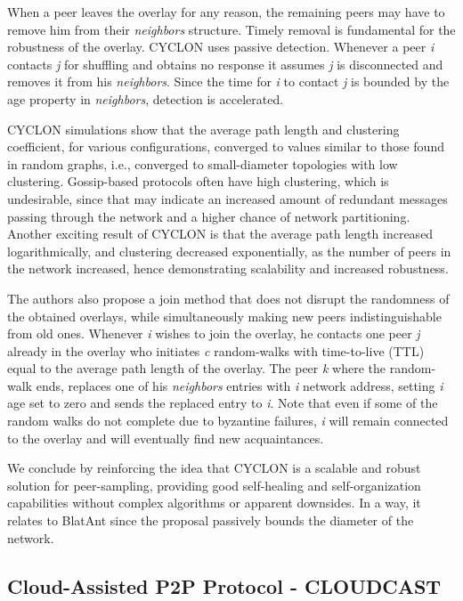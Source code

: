 \documentclass[runningheads]{llncs}
\begin{document}
When a peer leaves the overlay for any reason, the remaining peers may have to remove him from their \textit{neighbors} structure. Timely removal is fundamental for the robustness of the overlay.  CYCLON uses passive detection. Whenever a peer \textit{i} contacts \textit{j} for shuffling and obtains no response it assumes \textit{j} is disconnected and removes it from his \textit{neighbors}. Since the time for \textit{i} to contact \textit{j} is bounded by the age property in \textit{neighbors}, detection is accelerated.

CYCLON simulations show that the average path length and clustering coefficient, for various configurations, converged to values similar to those found in random graphs, i.e., converged to small-diameter topologies with low clustering. Gossip-based protocols often have high clustering, which is undesirable, since that may indicate an increased amount of redundant messages passing through the network and a higher chance of network partitioning. Another exciting result of CYCLON is that the average path length increased logarithmically, and clustering decreased exponentially, as the number of peers in the network increased, hence demonstrating scalability and increased robustness.

The authors also propose a join method that does not disrupt the randomness of the obtained overlays, while simultaneously making new peers indistinguishable from old ones. Whenever \textit{i} wishes to join the overlay, he contacts one peer \textit{j} already in the overlay who initiates \textit{c} random-walks with time-to-live (TTL) equal to the average path length of the overlay. The peer \textit{k} where the random-walk ends, replaces one of his \textit{neighbors} entries with \textit{i} network address, setting \textit{i} age set to zero and sends the replaced entry to \textit{i}. Note that even if some of the random walks do not complete due to byzantine failures, \textit{i} will remain connected to the overlay and will eventually find new acquaintances.

We conclude by reinforcing the idea that CYCLON is a scalable and robust solution for peer-sampling, providing good self-healing and self-organization capabilities without complex algorithms or apparent downsides. In a way, it relates to BlatAnt since the proposal passively bounds the diameter of the network.

\subsection{Cloud-Assisted P2P Protocol - CLOUDCAST}
\end{document}

